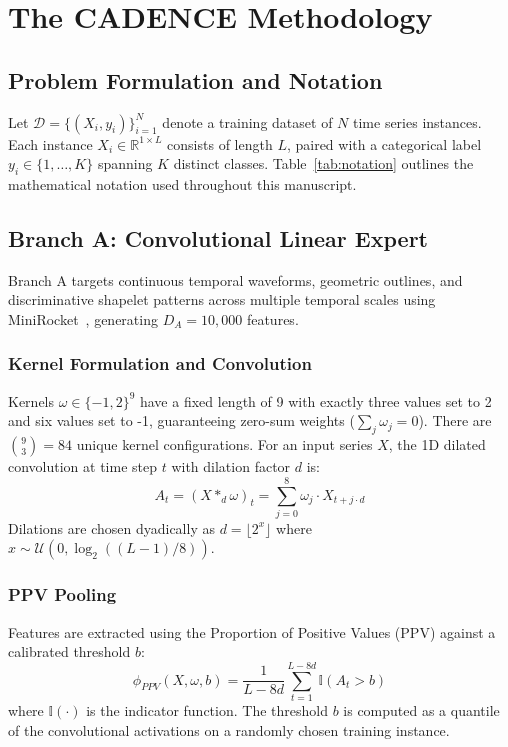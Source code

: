 \documentclass[journal,twocolumn]{article}
\begin{document}


\section{The CADENCE Methodology}

\subsection{Problem Formulation and Notation}
Let $\mathcal{D} = \{(X_i, y_i)\}_{i=1}^N$ denote a training dataset of $N$ time series instances. Each instance $X_i \in \mathbb{R}^{1 \times L}$ consists of length $L$, paired with a categorical label $y_i \in \{1, \dots, K\}$ spanning $K$ distinct classes. Table~\ref{tab:notation} outlines the mathematical notation used throughout this manuscript.

\subsection{Branch A: Convolutional Linear Expert}
Branch A targets continuous temporal waveforms, geometric outlines, and discriminative shapelet patterns across multiple temporal scales using MiniRocket~\cite{dempster2021minirocket}, generating $D_A = 10,000$ features.

\subsubsection{Kernel Formulation and Convolution}
Kernels $\omega \in \{-1, 2\}^9$ have a fixed length of 9 with exactly three values set to 2 and six values set to -1, guaranteeing zero-sum weights ($\sum_j \omega_j = 0$). There are $\binom{9}{3} = 84$ unique kernel configurations. For an input series $X$, the 1D dilated convolution at time step $t$ with dilation factor $d$ is:
\begin{equation}
    A_t = (X *_{d} \omega)_t = \sum_{j=0}^{8} \omega_j \cdot X_{t + j \cdot d}
    \label{eq:convolution}
\end{equation}
Dilations are chosen dyadically as $d = \lfloor 2^x \rfloor$ where $x \sim \mathcal{U}(0, \log_2((L-1)/8))$.

\subsubsection{PPV Pooling}
Features are extracted using the Proportion of Positive Values (PPV) against a calibrated threshold $b$:
\begin{equation}
    \phi_{PPV}(X, \omega, b) = \frac{1}{L - 8d} \sum_{t=1}^{L - 8d} \mathbb{I}(A_t > b)
    \label{eq:ppv}
\end{equation}
where $\mathbb{I}(\cdot)$ is the indicator function. The threshold $b$ is computed as a quantile of the convolutional activations on a randomly chosen training instance.
\end{document}
